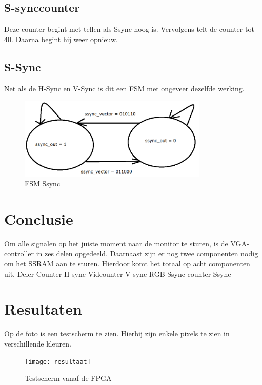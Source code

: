 \documentclass[oneside,dutch]{tudelft-report}
\begin{document}
\subsection{S-synccounter}
Deze counter begint met tellen als Ssync hoog is. Vervolgens telt de counter tot 40. Daarna begint hij weer opnieuw.

\subsection{S-Sync}
Net als de H-Sync en V-Sync is dit een FSM met ongeveer dezelfde werking. 

\begin{figure}[H]
\center
\includegraphics[width=9cm]{FSM-Ssync}
\caption{FSM Ssync}
\label{VGA}
\end{figure}

\section{Conclusie}
Om alle signalen op het juiste moment naar de monitor te sturen, is de VGA-controller in zes delen opgedeeld. Daarnaast zijn er nog twee componenten nodig om het SSRAM aan te sturen. Hierdoor komt het totaal op acht componenten uit. 
Deler
Counter
H-sync
Vidcounter
V-sync
RGB
Ssync-counter
Ssync

\section{Resultaten}
Op de foto is een testscherm te zien. Hierbij zijn enkele pixels te zien in verschillende kleuren.

\begin{figure}[H]
\center
\texttt{[image: resultaat]}
\caption{Testscherm vanaf de FPGA}
\label{VGA}
\end{figure}
\end{document}

